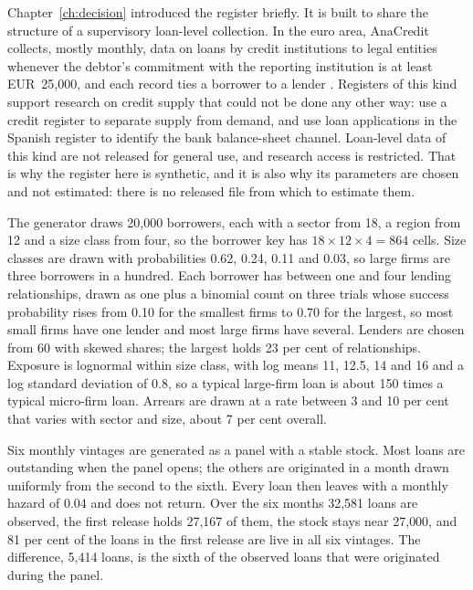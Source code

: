 Chapter~\ref{ch:decision} introduced the register briefly. It is built to share the
structure of a supervisory loan-level collection. In the euro area, AnaCredit
collects, mostly monthly, data on loans by credit institutions to legal entities
whenever the debtor's commitment with the reporting institution is at least
EUR~25{,}000, and each record ties a borrower to a lender
\citep{ecb2022,israel2017}.
Registers of this kind support research on credit supply that could not be done any
other way: \citet{khwaja2008} use a credit register to separate supply from demand,
and \citet{jimenez2012} use loan applications in the Spanish register to identify
the bank balance-sheet channel. Loan-level data of this kind are not released for
general use, and research access is restricted. That is why the register here is
synthetic, and it is also why its parameters are chosen and not estimated: there is
no released file from which to estimate them.

The generator draws 20{,}000 borrowers, each with a sector from 18, a region from
12 and a size class from four, so the borrower key has $18 \times 12 \times 4 = 864$
cells. Size classes are drawn with probabilities 0.62, 0.24, 0.11 and 0.03, so large
firms are three borrowers in a hundred. Each borrower has between one and four
lending relationships, drawn as one plus a binomial count on three trials whose
success probability rises from 0.10 for the smallest firms to 0.70 for the largest,
so most small firms have one lender and most large firms have several. Lenders are
chosen from 60 with skewed shares; the largest holds 23 per cent of relationships.
Exposure is lognormal within size class, with log means 11, 12.5, 14 and 16 and a
log standard deviation of 0.8, so a typical large-firm loan is about 150 times a
typical micro-firm loan. Arrears are drawn at a rate between 3 and 10 per cent that
varies with sector and size, about 7 per cent overall.

Six monthly vintages are generated as a panel with a stable stock. Most loans are
outstanding when the panel opens; the others are originated in a month drawn
uniformly from the second to the sixth. Every loan then leaves with a monthly hazard
of 0.04 and does not return. Over the six months 32{,}581 loans are observed, the
first release holds 27{,}167 of them, the stock stays near 27{,}000, and 81 per cent
of the loans in the first release are live in all six vintages.
The difference, 5{,}414 loans, is the sixth of the observed loans that were
originated during the panel.

